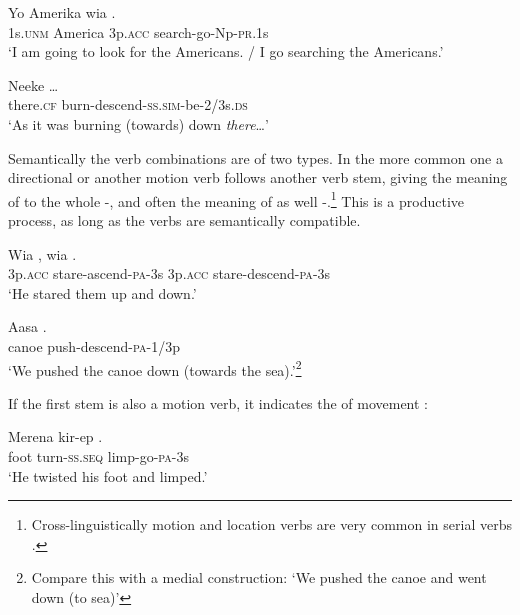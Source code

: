 \ea%
\label{ex:3:x378}
\gll Yo Amerika wia . \\
1s.\textsc{unm} America 3p.\textsc{acc} search-go-Np-\textsc{pr}.1s \\
\glt`I am going to look for the Americans. / I go searching the Americans.' 
\z

\ea%
\label{ex:3:x379}
\gll Neeke  {\dots} \\
there.\textsc{cf} burn-descend-\textsc{ss}.\textsc{sim}-be-2/3s.\textsc{ds}\\
\glt`As it was burning (towards) down \textit{there}{\dots}'
\z

Semantically the verb combinations are of two types. In the more common one a directional or another motion verb follows another verb stem, giving the meaning of  to the whole -, and often the meaning of  as well -.\footnote{Cross-linguistically motion and location verbs are very common in serial verbs \citep[9]{Lord1993}.} This is a productive process, as long as the verbs are semantically compatible.

\ea%
\label{ex:3:x438}
\gll Wia , wia . \\
3p.\textsc{acc} stare-ascend-\textsc{pa}-3s 3p.\textsc{acc} stare-descend-\textsc{pa}-3s\\
\glt`He stared them up and down.'
\z

\ea%
\label{ex:3:x381}
\gll Aasa . \\
canoe push-descend-\textsc{pa}-1/3p \\
\glt`We pushed the canoe down (towards the sea).'\footnote{Compare this with a medial construction:  `We pushed the canoe and went down (to sea)'}
\z

If the first stem is also a motion verb, it indicates the  of movement :

\ea%
\label{ex:3:x380}
\gll Merena kir-ep . \\
foot turn-\textsc{ss}.\textsc{seq} limp-go-\textsc{pa}-3s \\
\glt`He twisted his foot and limped.'
\z

